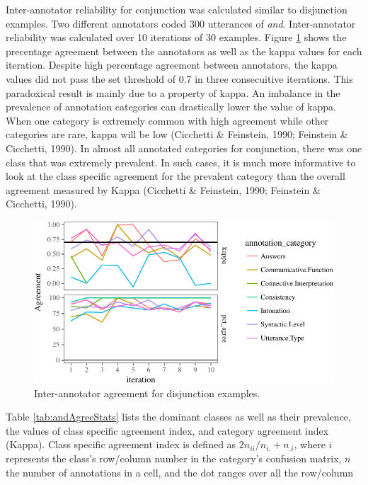 \documentclass[oneside]{report}
\theoremstyle{definition}
\theoremstyle{definition}
\theoremstyle{definition}
\theoremstyle{remark}
\begin{document}
Inter-annotator reliability for conjunction was calculated similar to
disjunction examples. Two different annotators coded 300 utterances of
\emph{and}. Inter-annotator reliability was calculated over 10
iterations of 30 examples. Figure \ref{fig:andReliabilityPlot} shows the
precentage agreement between the annotators as well as the kappa values
for each iteration. Despite high percentage agreement between
annotators, the kappa values did not pass the set threshold of 0.7 in
three consecuitive iterations. This paradoxical result is mainly due to
a property of kappa. An imbalance in the prevalence of annotation
categories can drastically lower the value of kappa. When one category
is extremely common with high agreement while other categories are rare,
kappa will be low (Cicchetti \& Feinstein, 1990; Feinstein \& Cicchetti,
1990). In almost all annotated categories for conjunction, there was one
class that was extremely prevalent. In such cases, it is much more
informative to look at the class specific agreement for the prevalent
category than the overall agreement measured by Kappa (Cicchetti \&
Feinstein, 1990; Feinstein \& Cicchetti, 1990).
\begin{figure}[tb]

{\centering \includegraphics{figs/andReliabilityPlot-1} 

}

\caption{Inter-annotator agreement for disjunction examples.}\label{fig:andReliabilityPlot}
\end{figure}
Table \ref{tab:andAgreeStats} lists the dominant classes as well as
their prevalence, the values of class specific agreement index, and
category agreement index (Kappa). Class specific agreement index is
defined as \(2n_{ii}/n_{i.}+n_{.i}\), where \(i\) represents the class's
row/column number in the category's confusion matrix, \(n\) the number
of annotations in a cell, and the dot ranges over all the row/column
\end{document}

